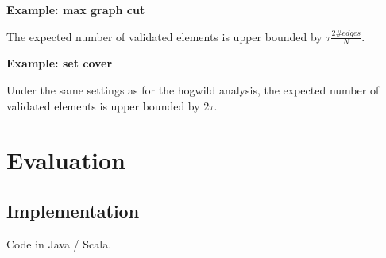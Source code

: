 \documentclass{article} %
\begin{document}
\textbf{Example: max graph cut}

The expected number of validated elements is upper bounded by $\tau \frac{2\#edges}{N}$.

\textbf{Example: set cover}

Under the same settings as for the hogwild analysis, the expected number of validated elements is upper bounded by $2\tau$.

















\section{Evaluation}

\subsection{Implementation}
Code in Java / Scala.
\end{document}
